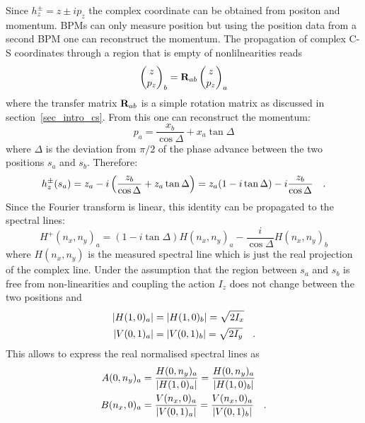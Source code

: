 Since $h_z^\pm = z \pm ip_z$ the complex coordinate can be obtained from positon and momentum.
BPMs can only measure position but using the position data from a second BPM one can reconstruct the momentum.
The propagation of complex C-S coordinates through a region that is empty of nonlilnearities reads
%
\begin{equation}
    \begin{pmatrix}
        z\\p_z
    \end{pmatrix}_b = \mathbf{R}_{ab} 
    \begin{pmatrix}
        z\\p_z
    \end{pmatrix}_a
\end{equation}
%
where the transfer matrix $\mathbf{R}_{ab}$ is a simple rotation matrix as discussed in section~\ref{sec_intro_cs}.
From this one can reconstruct the momentum:
%
\begin{equation}
    p_a = \frac{x_b}{\cos\Delta} + x_a \tan\Delta
\end{equation}
%
where $\Delta$ is the deviation from $\pi/2$ of the phase advance between the two positions $s_a$ and $s_b$.
Therefore:
%
\begin{equation}
    h_z^\pm(s_a) = z_a - i \left(\frac{z_b}{\cos\Delta} + z_a\tan\Delta \right) = z_a(1-i\tan\Delta) - i \frac{z_b}{\cos\Delta}
    \quad .
\end{equation}
%
Since the Fourier transform is linear, this identity can be propagated to the spectral lines:
%
\begin{equation}
    H^+(n_x,n_y)_a = (1-i\tan\Delta)H(n_x,n_y)_a - \frac{i}{\cos\Delta}H(n_x,n_y)_b
    \label{eq_reconstr_cplx}
\end{equation}
where $H(n_x,n_y)$ is the measured spectral line which is just the real projection of the complex line. 
%
Under the assumption that the region between $s_a$ and $s_b$ is free from non-linearities and coupling
the action $I_z$ does not change between the two positions and
%
\begin{align}
    |H(1,0)_a| &= |H(1,0)_b| = \sqrt{2I_x} \notag\\
    |V(0,1)_a| &= |V(0,1)_b| = \sqrt{2I_y}
    \quad .
\end{align}
%
This allows to express the real normalised spectral lines as
%
\begin{align}
    A(0,n_y)_a &= \frac{H(0,n_y)_a}{\left| H(1,0)_a \right|} = \frac{H(0,n_y)_a}{\left| H(1,0)_b \right|} \notag \\
    B(n_x,0)_a &= \frac{V(n_x,0)_a}{\left| V(0,1)_a \right|} = \frac{V(n_x,0)_a}{\left| V(0,1)_b \right|} 
    \quad .
\end{align}
